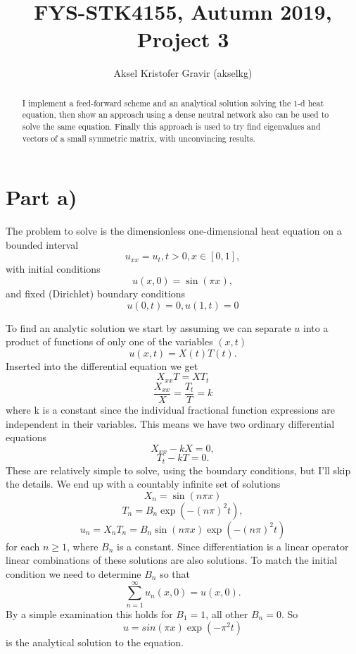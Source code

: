 \documentclass[10pt,a4paper]{article}
\begin{document}
\title{FYS-STK4155, Autumn 2019, Project 3}
\author{Aksel Kristofer Gravir (akselkg)}
\maketitle

\begin{abstract}
I implement a feed-forward scheme and an analytical solution solving the 1-d heat equation, then show an approach using a dense neutral network also can be used to solve the same equation. Finally this approach is used to try find eigenvalues and vectors of a small symmetric matrix, with unconvincing results.
\end{abstract}


\section*{Part a)}
The problem to solve is the dimensionless one-dimensional heat equation on a bounded interval
\[u_{xx} = u_t, t>0, x \in [0,1],\]
with initial conditions 
\[u(x,0) = \sin(\pi x),\]
and fixed (Dirichlet) boundary conditions
\[u(0,t) = 0, u(1,t) = 0\]

To find an analytic solution we start by assuming we can separate $u$ into a product of functions of only one of the variables $(x,t)$
\[u(x,t) = X(t)T(t).\]
Inserted into the differential equation we get
\[X_{xx}T= XT_t\]
\[\frac{X_{xx}}{X} = \frac{T_t}{T} = k\]
where k is a constant since the individual fractional function expressions are independent in their variables. This means we have two ordinary differential equations
\[X_{xx} - kX = 0,\]
\[T_t - kT = 0.\]
These are relatively simple to solve, using the boundary conditions, but I'll skip the details. We end up with a countably infinite set of solutions 
\[X_n = \sin(n \pi x)\]
\[T_n = B_n \exp(-(n\pi)^2 t),\]
\[u_n = X_n T_n = B_n \sin(n \pi x) \exp(-(n\pi)^2 t)\]
for each $n \geq 1$, where $B_n$ is a constant. Since differentiation is a linear operator linear combinations of these solutions are also solutions. To match the initial condition we need to determine $B_n$ so that
\[\sum_{n=1}^{\infty} u_n(x,0) = u(x, 0).\]
By a simple examination this holds for $B_1 = 1$, all other $B_n = 0$. So 
\[u = sin(\pi x) \exp(-\pi^2 t)\]
is the analytical solution to the equation.
\end{document}
